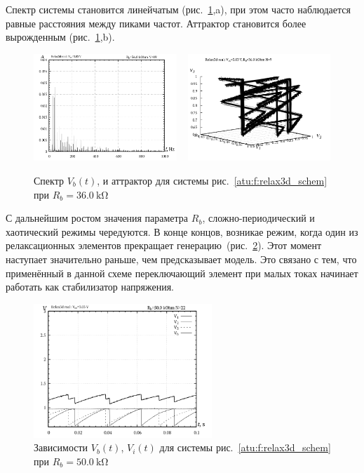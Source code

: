 Спектр системы становится линейчатым (рис.~\ref{atu:f:relax3d_f_09},a), при этом
часто наблюдается равные расстояния между пиками частот.
Аттрактор становится более вырожденным (рис.~\ref{atu:f:relax3d_f_09},b).

\begin{figure}[htb!]
  \centerline{
    \includegraphics[width=0.48\textwidth]{p/relax3d_f_09.png}
    ~
    \includegraphics[width=0.48\textwidth]{p/relax3d_v1v2v3_09.png}
  }
  \caption{Спектр $V_b(t)$, и аттрактор для системы рис.~\ref{atu:f:relax3d_schem} при $R_b=\SI{36.0}{\kilo\ohm}$ }
  \label{atu:f:relax3d_f_09}
\end{figure}

С дальнейшим ростом значения параметра $R_b$, сложно-периодический и хаотический
режимы чередуются. В конце концов, возникае режим, когда
один из релаксационных элементов прекращает генерацию~(рис.~\ref{atu:f:relax3d_t_22}).
Этот момент наступает значительно раньше, чем предсказывает
модель. Это связано с тем, что применённый в данной схеме переключающий элемент
при малых токах начинает работать как стабилизатор напряжения.

\begin{figure}[htb!]
  \centerline{\includegraphics[width=0.6\textwidth]{p/relax3d_t_22.png} }
  \caption{Зависимости $V_b(t)$, $V_i(t)$ для системы рис.~\ref{atu:f:relax3d_schem} при $R_b=\SI{50.0}{\kilo\ohm}$ }
  \label{atu:f:relax3d_t_22}
\end{figure}

